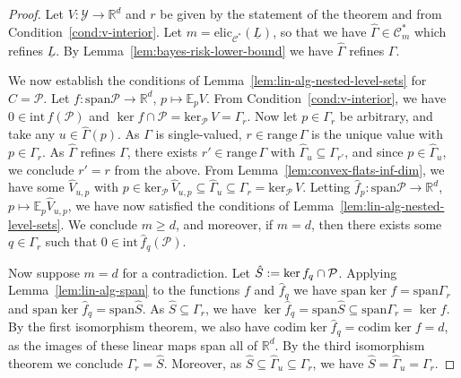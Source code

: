 \documentclass[11pt]{article} %
\newcommand{\Comments}{1}
\newcommand{\mytodo}[2]{\ifnum\Comments=1%
	\todo[linecolor=#1!80!black,backgroundcolor=#1,bordercolor=#1!80!black]{#2}\fi}
\newcommand{\btw}[1]{}%
\newcommand{\reals}{\mathbb{R}}
\newcommand{\interior}{\mathrm{int}\,}
\newcommand{\elic}{\mathrm{elic}}
\newcommand{\spn}{\mathrm{span}}
\newcommand{\range}{\mathrm{range}\,}
\newcommand{\zeros}[1]{\mathrm{ker}_\P\,#1}
\newcommand{\codim}{\mathrm{codim}}
\newcommand{\C}{\mathcal{C}}
\newcommand{\E}{\mathbb{E}}
\renewcommand{\P}{\mathcal{P}}
\newcommand{\Y}{\mathcal{Y}}
\newcommand{\lbar}{\underline{L}} %
\newtheorem{theorem}{Theorem}
\begin{document}
\bayesrisklowerbound*
\begin{proof}
  Let $V:\Y\to\reals^d$ and $r$ be given by the statement of the theorem and from Condition~\ref{cond:v-interior}.
  Let $m = \elic_{\C^*}(\lbar)$, so that we have $\hat\Gamma\in\C^*_m$ which refines $\lbar$.
  By Lemma~\ref{lem:bayes-risk-lower-bound} we have $\hat\Gamma$ refines $\Gamma$.

  \btw{Notes to self about the proof commented out here}

  We now establish the conditions of Lemma~\ref{lem:lin-alg-nested-level-sets} for $C=\P$.
  Let $f:\spn \P \to \reals^d$, $p \mapsto \E_pV$.
  From Condition~\ref{cond:v-interior}, we have $0\in\interior f(\P)$ and $\ker f \cap \P = \zeros{V} = \Gamma_r$.
  Now let $p\in\Gamma_r$ be arbitrary, and take any $u\in\hat\Gamma(p)$.
  As $\Gamma$ is single-valued, $r\in\range\Gamma$ is the unique value with $p\in\Gamma_r$.
  As $\hat\Gamma$ refines $\Gamma$, there exists $r'\in\range\Gamma$ with $\hat\Gamma_u \subseteq \Gamma_{r'}$, and since $p\in\hat\Gamma_u$, we conclude $r'=r$ from the above.
  From Lemma~\ref{lem:convex-flats-inf-dim}, we have some $\hat V_{u,p}$ with $p\in\zeros{\hat V_{u,p}} \subseteq \hat\Gamma_u \subseteq \Gamma_r = \zeros{V}$.
  Letting $\hat f_p:\spn \P \to \reals^d$, $p \mapsto \E_p\hat V_{u,p}$, we have now satisfied the conditions of Lemma~\ref{lem:lin-alg-nested-level-sets}.
  We conclude $m \geq d$, and moreover, if $m=d$, then there exists some $q\in\Gamma_r$ such that $0 \in\interior\hat f_q(\P)$.
    
  Now suppose $m = d$ for a contradiction.
  Let $\hat S\defeq \ker f_q\cap \P$.
  Applying Lemma~\ref{lem:lin-alg-span} to the functions $f$ and $\hat f_q$
  we have $\spn \ker f = \spn \Gamma_r$ and $\spn \ker \hat f_q = \spn \hat S$.
  As $\hat S \subseteq \Gamma_r$, we have $\ker \hat f_q = \spn \hat S \subseteq \spn \Gamma_r = \ker f$.
  By the first isomorphism theorem, we also have $\codim \ker \hat f_q = \codim \ker f = d$, as the images of these linear maps span all of $\reals^d$.
  By the third isomorphism theorem we conclude $\Gamma_r = \hat S$.
  Moreover, as $\hat S \subseteq \hat\Gamma_u \subseteq \Gamma_r$, we have $\hat S = \hat\Gamma_u = \Gamma_r$.


\end{proof}
\end{document}
